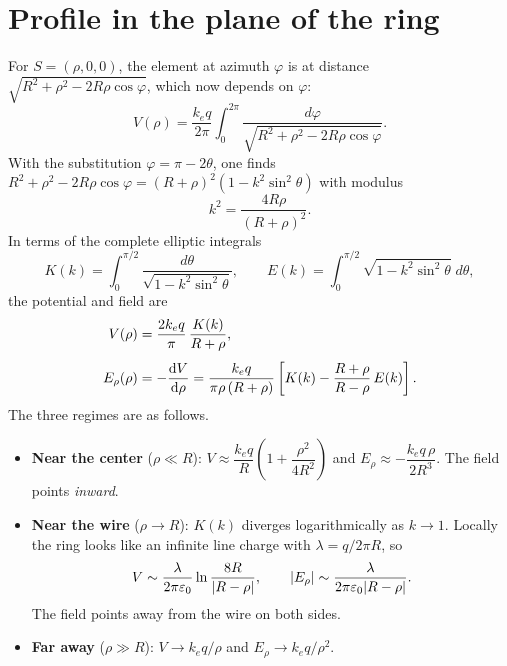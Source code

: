 \documentclass[11pt,a4paper]{article}
\newcommand{\ke}{k_e}
\begin{document}
\section{Profile in the plane of the ring}

For $S=(\rho,0,0)$, the element at azimuth $\varphi$ is at distance $\sqrt{R^2+\rho^2-2R\rho\cos\varphi}$, which now depends on $\varphi$:
\begin{equation}
V(\rho) = \frac{\ke q}{2\pi}\int_0^{2\pi}
\frac{d\varphi}{\sqrt{R^2+\rho^2-2R\rho\cos\varphi}} .
\end{equation}
With the substitution $\varphi=\pi-2\theta$, one finds $R^2+\rho^2-2R\rho\cos\varphi=(R+\rho)^2\left(1-k^2\sin^2\theta\right)$ with modulus
\begin{equation}
k^2 = \frac{4R\rho}{(R+\rho)^2}.
\end{equation}
In terms of the complete elliptic integrals
\begin{equation}
K(k)=\int_0^{\pi/2}\frac{d\theta}{\sqrt{1-k^2\sin^2\theta}},
\qquad
E(k)=\int_0^{\pi/2}\sqrt{1-k^2\sin^2\theta}\;d\theta ,
\end{equation}
the potential and field are
\begin{align}
V(\rho) &= \frac{2\ke q}{\pi}\,\frac{K(k)}{R+\rho}, \label{eq:planeV}\\[4pt]
E_\rho(\rho) &= -\dv{V}{\rho} = \frac{\ke q}{\pi\rho\,(R+\rho)}\left[K(k)-\frac{R+\rho}{R-\rho}\,E(k)\right]. \label{eq:planeE}
\end{align}
The three regimes are as follows.
\begin{itemize}
  \item \textbf{Near the center} ($\rho\ll R$): $V\approx \dfrac{\ke q}{R}\left(1+\dfrac{\rho^2}{4R^2}\right)$ and $E_\rho\approx-\dfrac{\ke q\,\rho}{2R^3}$. The field points \emph{inward}.
  \item \textbf{Near the wire} ($\rho\to R$): $K(k)$ diverges logarithmically as $k\to1$. Locally the ring looks like an infinite line charge with $\lambda=q/2\pi R$, so
  \[
  V\sim\frac{\lambda}{2\pi\varepsilon_0}\ln\frac{8R}{\abs{R-\rho}},
  \qquad
  \abs{E_\rho}\sim\frac{\lambda}{2\pi\varepsilon_0\abs{R-\rho}} .
  \]
  The field points away from the wire on both sides.
  \item \textbf{Far away} ($\rho\gg R$): $V\to \ke q/\rho$ and $E_\rho\to \ke q/\rho^2$.
\end{itemize}
\end{document}
